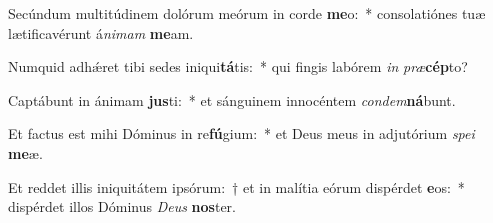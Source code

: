 \item Secúndum multitúdinem dolórum meórum in corde \textbf{me}o:~* consolatiónes tuæ lætificavérunt á\textit{ni}\textit{mam} \textbf{me}am.
\item Numquid adhǽret tibi sedes iniqui\textbf{tá}tis:~* qui fingis labórem \textit{in} \textit{præ}\textbf{cép}to?
\item Captábunt in ánimam \textbf{jus}ti:~* et sánguinem innocéntem \textit{con}\textit{dem}\textbf{ná}bunt.
\item Et factus est mihi Dóminus in re\textbf{fú}gium:~* et Deus meus in adjutórium \textit{spe}\textit{i} \textbf{me}æ.
\item Et reddet illis iniquitátem ipsórum:~† et in malítia eórum dispérdet \textbf{e}os:~* dispérdet illos Dóminus \textit{De}\textit{us} \textbf{nos}ter.
